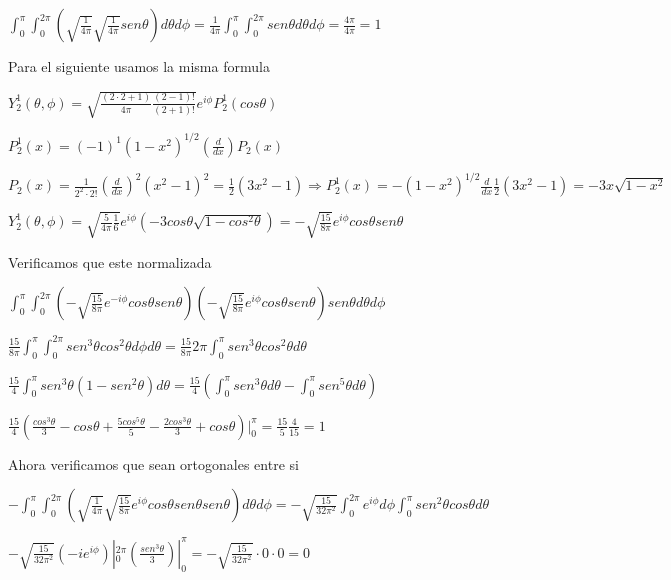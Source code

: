 \documentclass[10pt]{article}
\begin{document}
\begin{center}
    $\int_0^{\pi}\int_0^{2\pi}(\sqrt{\frac{1}{4\pi}}\sqrt{\frac{1}{4\pi}}sen\theta) d\theta d\phi=\frac{1}{4\pi}\int_0^{\pi}\int_0^{2\pi}sen\theta d\theta d\phi=\frac{4\pi}{4\pi}=1$
\end{center}

Para el siguiente usamos la misma formula 

\begin{center}
    $Y_2^1(\theta,\phi)=\sqrt{\frac{(2\cdot 2+1)}{4\pi}\frac{(2-1)!}{(2+1)!}}e^{i\phi}P_2^1(cos\theta)$

    $P_2^1(x)=(-1)^1(1-x^2)^{1/2}(\frac{d}{dx})P_2(x)$

    $P_2(x)=\frac{1}{2^2\cdot2!}(\frac{d}{dx})^2(x^2-1)^2=\frac{1}{2}(3x^2-1)\Rightarrow P_2^1(x)=-(1-x^2)^{1/2}\frac{d}{dx}\frac{1}{2}(3x^2-1)=-3x\sqrt{1-x^2}$

    $Y_2^1(\theta,\phi)=\sqrt{\frac{5}{4\pi}\frac{1}{6}}e^{i\phi}(-3cos\theta\sqrt{1-cos^2\theta})=-\sqrt{\frac{15}{8\pi}}e^{i\phi}cos\theta sen\theta$
\end{center}

Verificamos que este normalizada

\begin{center}
    $\int_0^{\pi}\int_0^{2\pi}(-\sqrt{\frac{15}{8\pi}}e^{-i\phi}cos\theta sen\theta)(-\sqrt{\frac{15}{8\pi}}e^{i\phi}cos\theta sen\theta)sen\theta d\theta d\phi$

    $\frac{15}{8\pi}\int_0^{\pi}\int_0^{2\pi}sen^3\theta cos^2\theta d\phi d\theta=\frac{15}{8\pi}2\pi\int_0^{\pi}sen^3\theta cos^2\theta d\theta$

    $\frac{15}{4}\int_0^{\pi}sen^3\theta(1-sen^2\theta)d\theta=\frac{15}{4}(\int_0^{\pi}sen^3\theta d\theta-\int_0^{\pi}sen^5\theta d\theta)$

    $\frac{15}{4}(\frac{cos^3\theta}{3}-cos\theta+\frac{5cos^5\theta}{5}-\frac{2cos^3\theta}{3}+cos\theta)|_0^{\pi}=\frac{15}{5}\frac{4}{15}=1$
\end{center}

Ahora verificamos que sean ortogonales entre si

\begin{center}
    $-\int_0^{\pi}\int_0^{2\pi}(\sqrt{\frac{1}{4\pi}}\sqrt{\frac{15}{8\pi}}e^{i\phi}cos\theta sen\theta sen\theta) d\theta d\phi=-\sqrt{\frac{15}{32\pi^2}}\int_0^{2\pi}e^{i\phi}d\phi \int_0^\pi sen^2\theta cos\theta d\theta $

    $-\sqrt{\frac{15}{32\pi^2}}(-ie^{i\phi})|_0^{2\pi}(\frac{sen^3\theta}{3})|_0^{\pi}= -\sqrt{\frac{15}{32\pi^2}} \cdot0\cdot0= 0$
\end{center}
\end{document}

